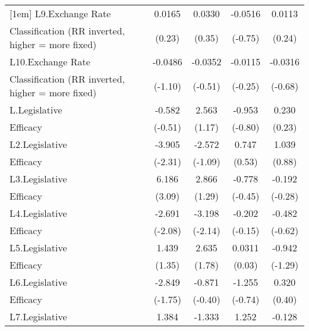 {\begin{tabular}{l*{4}{c}}
[1em]
L9.Exchange Rate    &      0.0165         &      0.0330         &     -0.0516         &      0.0113         \\
Classification (RR inverted, higher = more fixed)&      (0.23)         &      (0.35)         &     (-0.75)         &      (0.24)         \\
[1em]
L10.Exchange Rate   &     -0.0486         &     -0.0352         &     -0.0115         &     -0.0316         \\
Classification (RR inverted, higher = more fixed)&     (-1.10)         &     (-0.51)         &     (-0.25)         &     (-0.68)         \\
[1em]
L.Legislative       &      -0.582         &       2.563         &      -0.953         &       0.230         \\
Efficacy            &     (-0.51)         &      (1.17)         &     (-0.80)         &      (0.23)         \\
[1em]
L2.Legislative      &      -3.905\sym{*}  &      -2.572         &       0.747         &       1.039         \\
Efficacy            &     (-2.31)         &     (-1.09)         &      (0.53)         &      (0.88)         \\
[1em]
L3.Legislative      &       6.186\sym{**} &       2.866         &      -0.778         &      -0.192         \\
Efficacy            &      (3.09)         &      (1.29)         &     (-0.45)         &     (-0.28)         \\
[1em]
L4.Legislative      &      -2.691\sym{*}  &      -3.198\sym{*}  &      -0.202         &      -0.482         \\
Efficacy            &     (-2.08)         &     (-2.14)         &     (-0.15)         &     (-0.62)         \\
[1em]
L5.Legislative      &       1.439         &       2.635         &      0.0311         &      -0.942         \\
Efficacy            &      (1.35)         &      (1.78)         &      (0.03)         &     (-1.29)         \\
[1em]
L6.Legislative      &      -2.849         &      -0.871         &      -1.255         &       0.320         \\
Efficacy            &     (-1.75)         &     (-0.40)         &     (-0.74)         &      (0.40)         \\
[1em]
L7.Legislative      &       1.384         &      -1.333         &       1.252         &      -0.128         \\

\end{tabular}}
